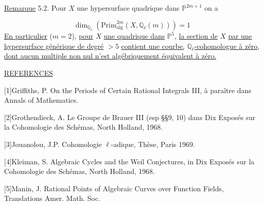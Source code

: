 \underline{Remarque} 5.2.  Pour $X$ une hypersurface quadrique dans $\mathbb{P}^{2m+1}$ on a

\begin{equation*}
\dim_{\mathbb{Q}_{\ell}}(\mathrm{Prim}^{2m}_{\mathrm{alg}}(X,\mathbb{Q}_{\ell}(m))) = 1
\end{equation*}
\underline{En particulier} ($m=2$), \underline{pour} $X$ \underline{une quadrique dans} $\mathbb{P}^5$, \underline{la section de} $X$ \underline{par une hypersurface générique de degré} $> 5$ \underline{contient une courbe,} $\mathbb{Q}_{\ell}$\underline{-cohomologue à zéro}, \underline{dont aucun multiple non nul n'est algébriquement équivalent à zéro.}


\underline{REFERENCES}

[1]\quad Griffiths, P.  On the Periods of Certain Rational Integrals III, à paraître dans Annals of Mathematics.

[2]\quad Grothendieck, A.  Le Groupe de Brauer III (esp \S\S 9, 10) dans Dix Exposés sur la Cohomologie des Schémas, North Holland, 1968.

[3]\quad Jouanolou, J.P.  Cohomologie $\ell$-adique, Thèse, Paris 1969.

[4]\quad Kleiman, S.  Algebraic Cycles and the Weil Conjectures, in Dix Exposés sur la Cohomologie des Schémas, North Holland, 1968.

[5]\quad Manin, J.  Rational Points of Algebraic Curves over Function Fields, Translations Amer. Math. Soc.
